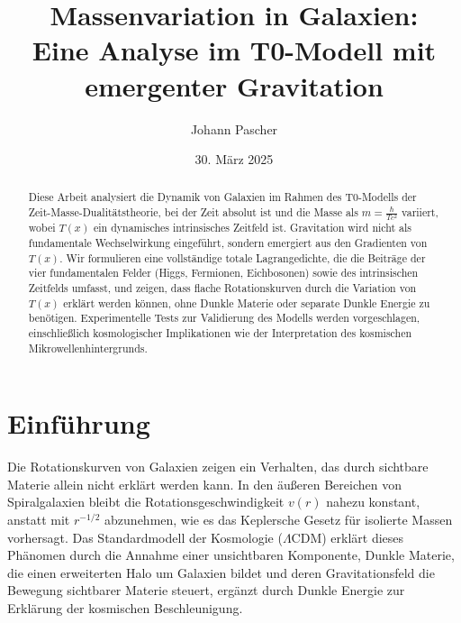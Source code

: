 \documentclass[12pt,a4paper]{article}
\title{Massenvariation in Galaxien: \\Eine Analyse im T0-Modell mit emergenter Gravitation}
\author{Johann Pascher}
\date{30. März 2025}
\newcommand{\Tfield}{T(x)}
\begin{document}
	
	\maketitle
	
	\begin{abstract}
		Diese Arbeit analysiert die Dynamik von Galaxien im Rahmen des T0-Modells der Zeit-Masse-Dualitätstheorie, bei der Zeit absolut ist und die Masse als \( m = \frac{\hbar}{T c^2} \) variiert, wobei \( \Tfield \) ein dynamisches intrinsisches Zeitfeld ist. Gravitation wird nicht als fundamentale Wechselwirkung eingeführt, sondern emergiert aus den Gradienten von \( \Tfield \). Wir formulieren eine vollständige totale Lagrangedichte, die die Beiträge der vier fundamentalen Felder (Higgs, Fermionen, Eichbosonen) sowie des intrinsischen Zeitfelds umfasst, und zeigen, dass flache Rotationskurven durch die Variation von \( \Tfield \) erklärt werden können, ohne Dunkle Materie oder separate Dunkle Energie zu benötigen. Experimentelle Tests zur Validierung des Modells werden vorgeschlagen, einschließlich kosmologischer Implikationen wie der Interpretation des kosmischen Mikrowellenhintergrunds.
	\end{abstract}
	
	\tableofcontents
	\newpage
	
	\section{Einführung}
	Die Rotationskurven von Galaxien zeigen ein Verhalten, das durch sichtbare Materie allein nicht erklärt werden kann. In den äußeren Bereichen von Spiralgalaxien bleibt die Rotationsgeschwindigkeit \( v(r) \) nahezu konstant, anstatt mit \( r^{-1/2} \) abzunehmen, wie es das Keplersche Gesetz für isolierte Massen vorhersagt. Das Standardmodell der Kosmologie (\(\Lambda\)CDM) erklärt dieses Phänomen durch die Annahme einer unsichtbaren Komponente, Dunkle Materie, die einen erweiterten Halo um Galaxien bildet und deren Gravitationsfeld die Bewegung sichtbarer Materie steuert, ergänzt durch Dunkle Energie zur Erklärung der kosmischen Beschleunigung.
	
\end{document}
